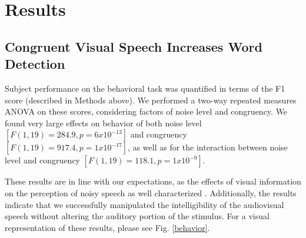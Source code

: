 \documentclass[10pt,letterpaper]{article}
\begin{document}


\section{Results}

\subsection{Congruent Visual Speech Increases Word Detection}

  Subject performance on the behavioral task was quantified in terms of the 
  F1 score (described in Methods above). We performed a two-way repeated 
  measures ANOVA on these scores, considering factors of noise level and 
  congruency. We found very large effects on behavior of both noise level 
  $[F(1,19) = 284.9, p = 6 x 10^{-13}]$ and congruency
  $[F(1, 19) = 917.4, p = 1 x 10^{-17}]$, as well as for the interaction 
  between noise level and congruency $[F(1, 19) = 118.1, p = 1 x 10^{-9}]$.

  These results are in line with our expectations, as the effects of visual 
  information on the perception of noisy speech as well characterized 
  \cite{Ross2007}. Additionally, the results indicate that we successfully 
  manipulated the intelligibility of the audiovisual speech without 
  altering the auditory portion of the stimulus.
  For a visual representation of these results, please see Fig. \ref{behavior}.
\end{document}
